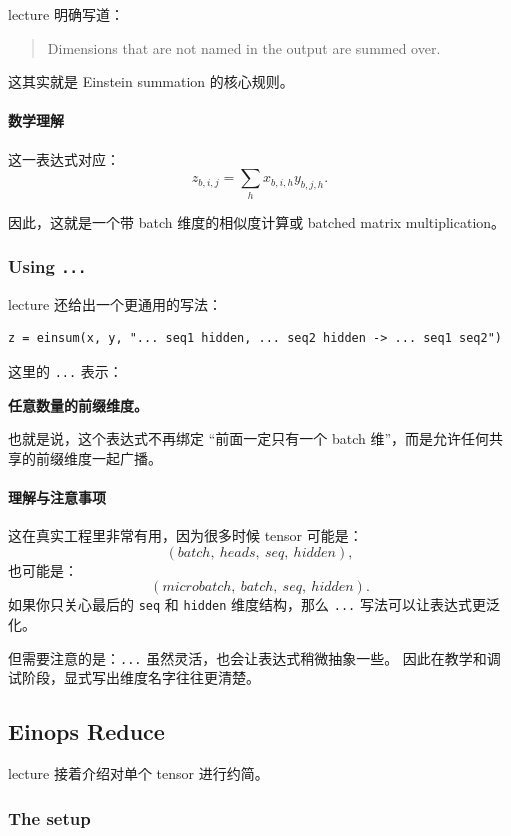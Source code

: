\documentclass[a4paper,UTF8]{article}
\numberwithin{equation}{section}
\begin{document}
lecture 明确写道：
\begin{quote}
Dimensions that are not named in the output are summed over.
\end{quote}

这其实就是 Einstein summation 的核心规则。

\paragraph{数学理解}
这一表达式对应：
\[
z_{b,i,j} = \sum_h x_{b,i,h} y_{b,j,h}.
\]

因此，这就是一个带 batch 维度的相似度计算或 batched matrix multiplication。

\subsubsection{Using \texttt{...}}

lecture 还给出一个更通用的写法：
\begin{verbatim}
z = einsum(x, y, "... seq1 hidden, ... seq2 hidden -> ... seq1 seq2")
\end{verbatim}

这里的 \verb|...| 表示：
\begin{center}
\textbf{任意数量的前缀维度。}
\end{center}

也就是说，这个表达式不再绑定 ``前面一定只有一个 batch 维''，而是允许任何共享的前缀维度一起广播。

\paragraph{理解与注意事项}
这在真实工程里非常有用，因为很多时候 tensor 可能是：
\[
(batch,\ heads,\ seq,\ hidden),
\]
也可能是：
\[
(microbatch,\ batch,\ seq,\ hidden).
\]
如果你只关心最后的 \verb|seq| 和 \verb|hidden| 维度结构，那么 \verb|...| 写法可以让表达式更泛化。

但需要注意的是：\verb|...| 虽然灵活，也会让表达式稍微抽象一些。  
因此在教学和调试阶段，显式写出维度名字往往更清楚。

\subsection{Einops Reduce}

lecture 接着介绍对单个 tensor 进行约简。

\subsubsection{The setup}
\end{document}
